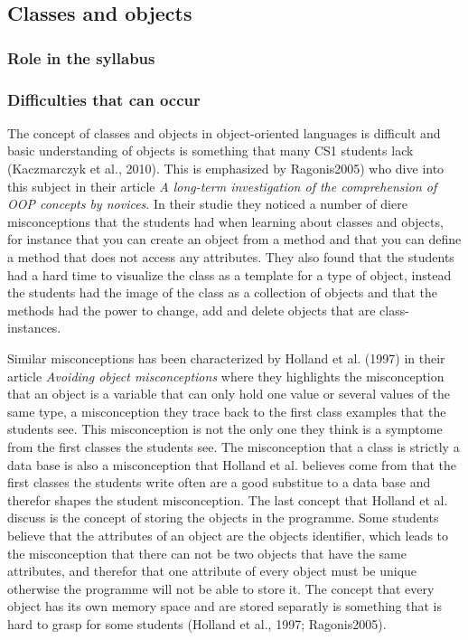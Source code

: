 \subsection{Classes and objects}

\subsubsection{Role in the syllabus}

\subsubsection{Difficulties that can occur}

The concept of classes and objects in object-oriented languages is difficult and basic understanding of objects is something that many CS1 students lack (Kaczmarczyk et al., 2010). This is emphasized by Ragonis2005) who dive into this subject in their article \emph{A long-term investigation of the comprehension of OOP concepts by novices}. In their studie they noticed a number of diere misconceptions that the students had when learning about classes and objects, for instance that you can create an object from a method and that you can define a method that does not access any attributes. They also found that the students had a hard time to visualize the class as a template for a type of object, instead the students had the image of the class as a collection of objects and that the methods had the power to change, add and delete objects that are class-instances. 

Similar misconceptions has been characterized by Holland et al. (1997) in their article \emph{Avoiding object misconceptions} where they highlights the misconception that an object is a variable that can only hold one value or several values of the same type, a misconception they trace back to the first class examples that the students see. This misconception is not the only one they think is a symptome from the first classes the students see. The misconception that a class is strictly a data base is also a misconception that Holland et al. believes come from that the first classes the students write often are a good substitue to a data base and therefor shapes the student misconception. The last concept that Holland et al. discuss is the concept of storing the objects in the programme. Some students believe that the attributes of an object are the objects identifier, which leads to the misconception that there can not be two objects that have the same attributes, and therefor that one attribute of every object must be unique otherwise the programme will not be able to store it. The concept that every object has its own memory space and are stored separatly is something that is hard to grasp for some students (Holland et al., 1997; Ragonis2005). 

